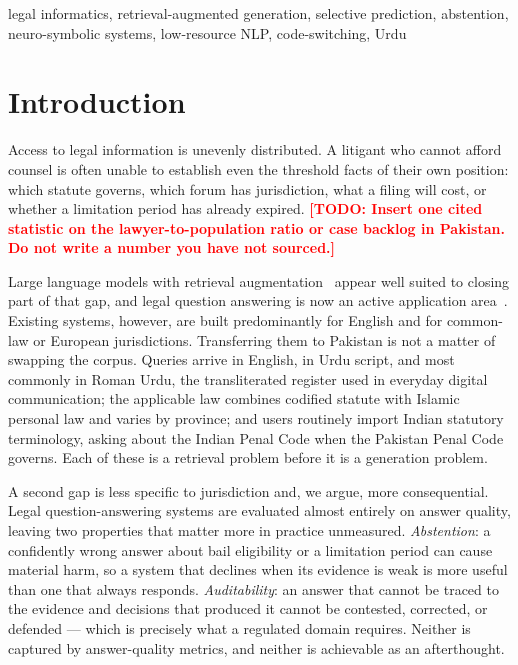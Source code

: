 \documentclass[conference]{IEEEtran}
\newcommand{\TODO}[1]{\textcolor{red}{\textbf{[TODO: #1]}}}
\begin{document}
\begin{IEEEkeywords}
legal informatics, retrieval-augmented generation, selective prediction,
abstention, neuro-symbolic systems, low-resource NLP, code-switching, Urdu
\end{IEEEkeywords}

\section{Introduction}
Access to legal information is unevenly distributed. A litigant who cannot
afford counsel is often unable to establish even the threshold facts of their
own position: which statute governs, which forum has jurisdiction, what a
filing will cost, or whether a limitation period has already expired.
\TODO{Insert one cited statistic on the lawyer-to-population ratio or case
backlog in Pakistan. Do not write a number you have not sourced.}

Large language models with retrieval augmentation~\cite{lewis2020rag} appear
well suited to closing part of that gap, and legal question answering is now an
active application area~\cite{chalkidis2020legalbert,guha2023legalbench}.
Existing systems, however, are built predominantly for English and for
common-law or European jurisdictions. Transferring them to Pakistan is not a
matter of swapping the corpus. Queries arrive in English, in Urdu script, and
most commonly in Roman Urdu, the transliterated register used in everyday
digital communication; the applicable law combines codified statute with
Islamic personal law and varies by province; and users routinely import Indian
statutory terminology, asking about the Indian Penal Code when the Pakistan
Penal Code governs. Each of these is a retrieval problem before it is a
generation problem.

A second gap is less specific to jurisdiction and, we argue, more consequential.
Legal question-answering systems are evaluated almost entirely on answer
quality, leaving two properties that matter more in practice unmeasured.
\emph{Abstention}: a confidently wrong answer about bail eligibility or a
limitation period can cause material harm, so a system that declines when its
evidence is weak is more useful than one that always responds.
\emph{Auditability}: an answer that cannot be traced to the evidence and
decisions that produced it cannot be contested, corrected, or defended --- which
is precisely what a regulated domain requires. Neither is captured by
answer-quality metrics, and neither is achievable as an afterthought.
\end{document}
